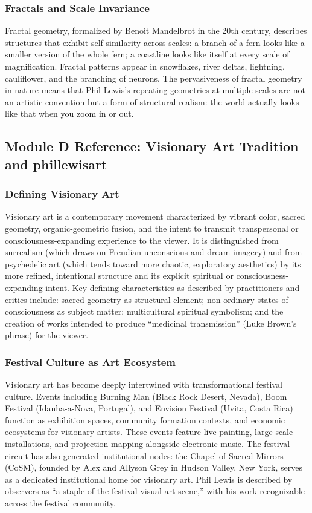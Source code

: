 \documentclass[11pt,letterpaper]{article}
\begin{document}
\subsubsection{Fractals and Scale Invariance}

Fractal geometry, formalized by Benoit Mandelbrot in the 20th century, describes structures that exhibit self-similarity across scales: a branch of a fern looks like a smaller version of the whole fern; a coastline looks like itself at every scale of magnification. Fractal patterns appear in snowflakes, river deltas, lightning, cauliflower, and the branching of neurons. The pervasiveness of fractal geometry in nature means that Phil Lewis's repeating geometries at multiple scales are not an artistic convention but a form of structural realism: the world actually looks like that when you zoom in or out.

\subsection{Module D Reference: Visionary Art Tradition and phillewisart}

\subsubsection{Defining Visionary Art}

Visionary art is a contemporary movement characterized by vibrant color, sacred geometry, organic-geometric fusion, and the intent to transmit transpersonal or consciousness-expanding experience to the viewer. It is distinguished from surrealism (which draws on Freudian unconscious and dream imagery) and from psychedelic art (which tends toward more chaotic, exploratory aesthetics) by its more refined, intentional structure and its explicit spiritual or consciousness-expanding intent. Key defining characteristics as described by practitioners and critics include: sacred geometry as structural element; non-ordinary states of consciousness as subject matter; multicultural spiritual symbolism; and the creation of works intended to produce ``medicinal transmission'' (Luke Brown's phrase) for the viewer.

\subsubsection{Festival Culture as Art Ecosystem}

Visionary art has become deeply intertwined with transformational festival culture. Events including Burning Man (Black Rock Desert, Nevada), Boom Festival (Idanha-a-Nova, Portugal), and Envision Festival (Uvita, Costa Rica) function as exhibition spaces, community formation contexts, and economic ecosystems for visionary artists. These events feature live painting, large-scale installations, and projection mapping alongside electronic music. The festival circuit has also generated institutional nodes: the Chapel of Sacred Mirrors (CoSM), founded by Alex and Allyson Grey in Hudson Valley, New York, serves as a dedicated institutional home for visionary art. Phil Lewis is described by observers as ``a staple of the festival visual art scene,'' with his work recognizable across the festival community.
\end{document}
